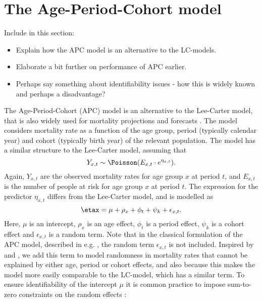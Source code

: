 \newpage
\section{The Age-Period-Cohort model}
\label{sec:APC-model}
\textcolor{myDarkGreen}{
Include in this section:
\begin{itemize}
    \item Explain how the APC model is an alternative to the LC-models.
    \item Elaborate a bit further on performance of APC earlier. 
    \item Perhaps say something about identifiability issues - how this is widely known and perhaps a disadvantage?
\end{itemize}
}
The Age-Period-Cohort (APC) model is an alternative to the Lee-Carter model, that is also widely used for mortality projections and forecasts \cite{rieblerHeld2010}. The model considers mortality rate as a function of the age group, period (typically calendar year) and cohort (typically birth year) of the relevant population. The model has a similar structure to the Lee-Carter model, assuming that 
\begin{equation}
    Y_{x,t} \sim \Poisson(E_{x,t}\cdot e^{\eta_{x,t}}).
\end{equation}
Again, $Y_{x,t}$ are the observed mortality rates for age group $x$ at period $t$, and $E_{x,t}$ is the number of people at risk for age group $x$ at period $t$. The expression for the predictor $\eta_{x,t}$ differs from the Lee-Carter model, and is modelled as
\begin{equation}
    \etax = \mu + \rho_x + \phi_t + \psi_k + \epsilon_{x,t}.
    \label{eq:APCmodel}
\end{equation}
Here, $\mu$ is an intercept, $\rho_x$ is an age effect, $\phi_t$ is a period effect, $\psi_k$ is a cohort effect and $\epsilon_{x,t}$ is a random term. Note that in the classical formulation of the APC model, described in e.g. \textcite{Clayton1987}, the random term $\epsilon_{x,t}$ is not included. Inspired by \textcite{RieblerThesis2010} and \textcite{Besag1995}, we add this term to model randomness in mortality rates that cannot be explained by either age, period or cohort effects, and also because this makes the model more easily comparable to the LC-model, which has a similar term. 
\newline
\noindent To ensure identifiability of the intercept $\mu$ it is common practice to impose sum-to-zero constraints on the random effects \cite{RieblerThesis2010}:
